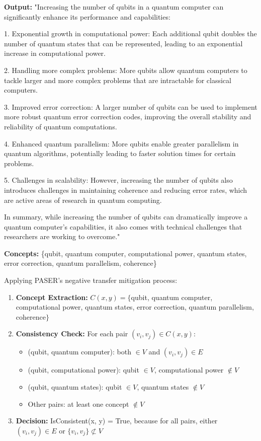 \textbf{Output:} "Increasing the number of qubits in a quantum computer can significantly enhance its performance and capabilities:

1. Exponential growth in computational power: Each additional qubit doubles the number of quantum states that can be represented, leading to an exponential increase in computational power.

2. Handling more complex problems: More qubits allow quantum computers to tackle larger and more complex problems that are intractable for classical computers.

3. Improved error correction: A larger number of qubits can be used to implement more robust quantum error correction codes, improving the overall stability and reliability of quantum computations.

4. Enhanced quantum parallelism: More qubits enable greater parallelism in quantum algorithms, potentially leading to faster solution times for certain problems.

5. Challenges in scalability: However, increasing the number of qubits also introduces challenges in maintaining coherence and reducing error rates, which are active areas of research in quantum computing.

In summary, while increasing the number of qubits can dramatically improve a quantum computer's capabilities, it also comes with technical challenges that researchers are working to overcome."

\textbf{Concepts:} \{qubit, quantum computer, computational power, quantum states, error correction, quantum parallelism, coherence\}

Applying PASER's negative transfer mitigation process:
\begin{enumerate}[leftmargin=*]
    \item \textbf{Concept Extraction:} 
    $C(x, y) = \{$qubit, quantum computer, computational power, quantum states, error correction, quantum parallelism, coherence$\}$

    \item \textbf{Consistency Check:}
    For each pair $(v_i, v_j) \in C(x, y)$:
    \begin{itemize}
        \item (qubit, quantum computer): both $\in V$ and $(v_i, v_j) \in E$
        \item (qubit, computational power): qubit $\in V$, computational power $\notin V$
        \item (qubit, quantum states): qubit $\in V$, quantum states $\notin V$
        \item Other pairs: at least one concept $\notin V$
    \end{itemize}

    \item \textbf{Decision:}
    IsConsistent(x, y) = True, because for all pairs, either $(v_i, v_j) \in E$ or $\{v_i, v_j\} \not\subset V$
\end{enumerate}

